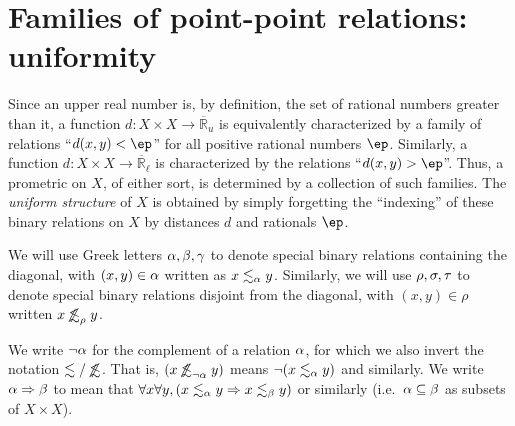 \documentclass{article}
\def\R{\mathbb{R}}
\def\Re{\overline{\R}}
\def\Reu{\Re_u}
\def\Rel{\Re_{\ell}}
\def\oapt{\mathrel{\!\not\,\not\lesssim}}
\def\leapx{\lesssim}
\def\ent#1{\leapx_{#1}}
\def\aent#1{\oapt_{#1}}
\let\implies\Rightarrow
\begin{document}


\section{Families of point-point relations: uniformity}
\label{sec:uniformity}

Since an upper real number is, by definition, the set of rational numbers greater than it, a function $d:X\times X \to \Reu$ is equivalently characterized by a family of relations ``$d(x,y)<\ep$'' for all positive rational numbers $\ep$.
Similarly, a function $d:X\times X \to \Rel$ is characterized by the relations ``$d(x,y)>\ep$''.
Thus, a prometric on $X$, of either sort, is determined by a collection of such families.
The \emph{uniform structure} of $X$ is obtained by simply forgetting the ``indexing'' of these binary relations on $X$ by distances $d$ and rationals $\ep$.

We will use Greek letters $\alpha,\beta,\gamma$ to denote special binary relations containing the diagonal, with $(x,y)\in \alpha$ written as $x\ent\al y$.
Similarly, we will use $\rho,\sigma,\tau$ to denote special binary relations disjoint from the diagonal, with $
(x,y)\in\rho$ written $x \aent\rho y$.

We write $\neg\alpha$ for the complement of a relation $\alpha$, for which we also invert the notation $\leapx/\oapt$.
That is, $(x \aent{\neg\al} y)$ means $\neg (x\ent{\al} y)$ and similarly.
We write $\al\implies\be$ to mean that $\forall x\forall y,(x\ent\al y \implies x\ent\be y)$ or similarly (i.e.\ $\alpha\subseteq \beta$ as subsets of $X\times X$).
\end{document}
